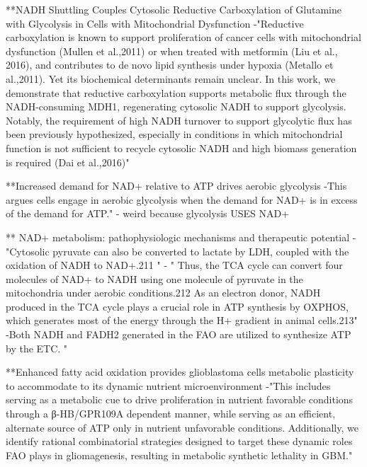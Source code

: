\documentclass[11pt,a4paper]{article}
\begin{document}
**NADH Shuttling Couples Cytosolic Reductive Carboxylation of Glutamine with Glycolysis in Cells with Mitochondrial Dysfunction
-"Reductive carboxylation is known to support proliferation of cancer cells with mitochondrial dysfunction (Mullen et al.,2011) or when treated with metformin (Liu et al., 2016), and contributes to de novo lipid synthesis under hypoxia (Metallo et al.,2011). Yet its biochemical determinants remain unclear. In this work, we demonstrate that reductive carboxylation supports metabolic flux through the NADH-consuming MDH1, regenerating cytosolic NADH to support glycolysis. Notably, the requirement of high NADH turnover to support glycolytic flux has been previously hypothesized, especially in conditions in which mitochondrial function is not sufficient to recycle cytosolic NADH and high biomass generation is required (Dai et al.,2016)"

**Increased demand for NAD+ relative to ATP drives aerobic glycolysis
-This argues cells engage in aerobic glycolysis when the demand for NAD+ is in excess of the demand for ATP."
- weird because glycolysis USES NAD+

** NAD+ metabolism: pathophysiologic mechanisms and therapeutic potential
- "Cytosolic pyruvate can also be converted to lactate by LDH, coupled with the oxidation of NADH to NAD+.211 "
- " Thus, the TCA cycle can convert four molecules of NAD+ to NADH using one molecule of pyruvate in the mitochondria under aerobic conditions.212 As an electron donor, NADH produced in the TCA cycle plays a crucial role in ATP synthesis by OXPHOS, which generates most of the energy through the H+ gradient in animal cells.213"
-Both NADH and FADH2 generated in the FAO are utilized to synthesize ATP by the ETC. "

**Enhanced fatty acid oxidation provides glioblastoma cells metabolic plasticity to accommodate to its dynamic nutrient microenvironment
-"This includes serving as a metabolic cue to drive proliferation in nutrient favorable conditions through a β-HB/GPR109A dependent manner, while serving as an efficient, alternate source of ATP only in nutrient unfavorable conditions. Additionally, we identify rational combinatorial strategies designed to target these dynamic roles FAO plays in gliomagenesis, resulting in metabolic synthetic lethality in GBM."
\end{document}
